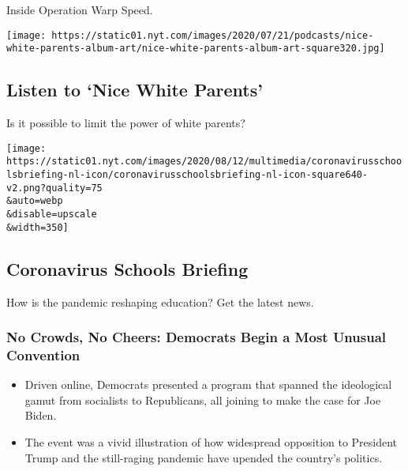 Inside Operation Warp Speed.

\href{/2020/08/13/podcasts/nice-white-parents-school.html}{}

\texttt{[image: https://static01.nyt.com/images/2020/07/21/podcasts/nice-white-parents-album-art/nice-white-parents-album-art-square320.jpg]}

\href{/2020/08/13/podcasts/nice-white-parents-school.html}{}

\hypertarget{listen-to-nice-white-parents}{%
\subsection{Listen to `Nice White
Parents'}\label{listen-to-nice-white-parents}}

Is it possible to limit the power of white parents?

\href{https://www.nytimes.com/newsletters/coronavirus-schools-briefing}{}

\texttt{[image: https://static01.nyt.com/images/2020/08/12/multimedia/coronavirusschoolsbriefing-nl-icon/coronavirusschoolsbriefing-nl-icon-square640-v2.png?quality=75\\\&auto=webp\\\&disable=upscale\\\&width=350]}

\href{https://www.nytimes.com/newsletters/coronavirus-schools-briefing}{}

\hypertarget{coronavirus-schools-briefing}{%
\subsection{Coronavirus Schools
Briefing}\label{coronavirus-schools-briefing}}

How is the pandemic reshaping education? Get the latest news.

\href{https://www.nytimes.com/2020/08/17/us/politics/democratic-national-convention-recap.html}{}

\hypertarget{no-crowds-no-cheers-democrats-begin-a-most-unusual-convention}{%
\subsubsection{No Crowds, No Cheers: Democrats Begin a Most Unusual
Convention}\label{no-crowds-no-cheers-democrats-begin-a-most-unusual-convention}}

\href{https://www.nytimes.com/2020/08/17/us/politics/democratic-national-convention-recap.html}{}

\begin{itemize}
\tightlist
\item
  Driven online, Democrats presented a program that spanned the
  ideological gamut from socialists to Republicans, all joining to make
  the case for Joe Biden.
\item
  The event was a vivid illustration of how widespread opposition to
  President Trump and the still-raging pandemic have upended the
  country's politics.
\end{itemize}

